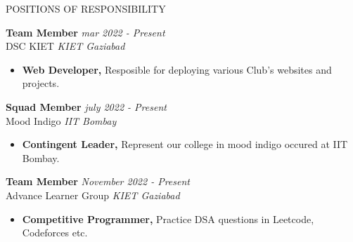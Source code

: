 \documentclass{resume} %
\begin{document}
\begin{rSection}{POSITIONS OF RESPONSIBILITY}

\textbf{Team Member} \hfill \textit{mar 2022 - Present}\\
DSC KIET \hfill \textit{KIET Gaziabad}
 \begin{itemize}
    \itemsep -3pt {} 
     \item \textbf {Web Developer,} Resposible for deploying various Club's websites and projects.
 \end{itemize}
 
\textbf{Squad Member} \hfill \textit{july 2022 - Present}\\
Mood Indigo \hfill \textit{IIT Bombay}
 \begin{itemize}
    \itemsep -3pt {} 
     \item \textbf {Contingent Leader,} Represent our college in mood indigo occured at IIT Bombay.

 \end{itemize}

 \textbf{Team Member} \hfill \textit{November 2022 - Present}\\
Advance Learner Group \hfill \textit{KIET Gaziabad}
 \begin{itemize}
    \itemsep -3pt {} 
     \item \textbf {Competitive Programmer,} Practice DSA questions in Leetcode, Codeforces etc.

 \end{itemize}

\end{rSection} 

\end{document}
